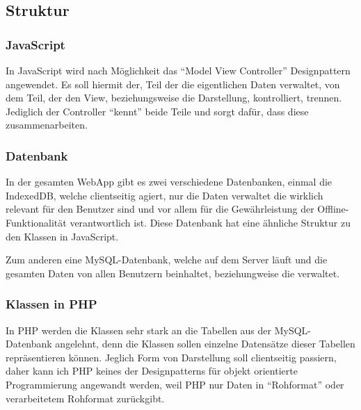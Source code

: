 \documentclass[a4paper,12pt,ngerman,listof=numbered]{scrartcl}      %
\let\oldcite\cite
\renewcommand{\cite}[1]{\textsuperscript{\oldcite{#1}}}
\begin{document}
	\subsection{Struktur}
	\subsubsection{JavaScript}
	In JavaScript wird nach Möglichkeit das ``Model View Controller''\cite{wikiMVC} Design\-pat\-tern angewendet. Es soll hiermit der, Teil der die eigentlichen Daten verwaltet, von dem Teil, der den View, beziehungsweise die Darstellung, kontrolliert, trennen. Jediglich der Controller ``kennt'' beide Teile und sorgt dafür, dass diese zusammenarbeiten.\par
	
	\subsubsection{Datenbank}
	In der gesamten WebApp gibt es zwei verschiedene Datenbanken, einmal die IndexedDB, welche clientseitig agiert, nur die Daten verwaltet die wirklich relevant für den Benutzer sind und vor allem für die Gewährleistung der Offline-Funk\-ti\-o\-na\-li\-tät verantwortlich ist. Diese Datenbank hat eine ähnliche Struktur zu den Klassen in JavaScript.\par
	Zum anderen eine MySQL-Datenbank, welche auf dem Server läuft und die gesamten Daten von allen Benutzern beinhaltet, beziehungweise die verwaltet.\par
	
	\subsubsection{Klassen in PHP}
	In PHP werden die Klassen sehr stark an die Tabellen aus der MySQL-Datenbank angelehnt, denn die Klassen sollen einzelne Datensätze dieser Tabellen repräsentieren können. Jeglich Form von Darstellung soll clientseitig passiern, daher kann ich PHP keines der Designpatterns für objekt orientierte Programmierung angewandt werden, weil PHP nur Daten in ``Rohformat'' oder verarbeitetem Rohformat zurückgibt.\par
	
\end{document}

